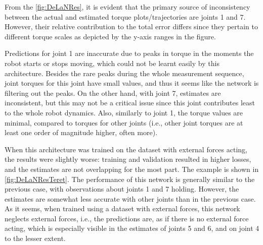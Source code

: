 From the \cref{fig:DeLaNRes}, it is evident that the primary source of inconsistency between the actual and estimated torque plots/trajectories are joints 1 and 7. However, their relative contribution to the total error differs since they pertain to different torque scales as depicted by the y-axis ranges in the figure.

Predictions for joint 1 are inaccurate due to peaks in torque in the moments the robot starts or stops moving, which could not be learnt easily by this architecture. Besides the rare peaks during the whole measurement sequence, joint torques for this joint have small values, and thus it seems like the network is filtering out the peaks. On the other hand, with joint 7, estimates are inconsistent, but this may not be a critical issue since this joint contributes least to the whole robot dynamics. Also, similarly to joint 1, the torque values are minimal, compared to torques for other joints (i.e., other joint torques are at least one order of magnitude higher, often more).

When this architecture was trained on the dataset with external forces acting, the results were slightly worse: training and validation resulted in higher losses, and the estimates are not overlapping for the most part. The example is shown in \cref{fig:DeLaNResTeret}. The performance of this network is generally similar to the previous case, with observations about joints 1 and 7 holding. However, the estimates are somewhat less accurate with other joints than in the previous case. As it seems, when trained using a dataset with external forces, this network neglects external forces, i.e., the predictions are, as if there is no external force acting, which is especially visible in the estimates of joints 5 and 6, and on joint 4 to the lesser extent.

